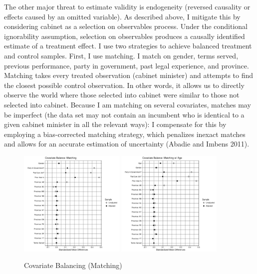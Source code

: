 \documentclass[letter,12pt]{article}
\begin{document}
The other major threat to estimate validity is endogeneity (reversed causality or effects caused by an omitted variable). As described above, I mitigate this by considering cabinet as a selection on observables process. Under the conditional ignorability assumption, selection on observables produces a causally identified estimate of a treatment effect. I use two strategies to achieve balanced treatment and control samples. First, I use matching. I match on gender, terms served, previous performance, party in government, past legal experience, and province. Matching takes every treated observation (cabinet minister) and attempts to find the closest possible control observation. In other words, it allows us to directly observe the world where those selected into cabinet were similar to those not selected into cabinet. Because I am matching on several covariates, matches may be imperfect (the data set may not contain an incumbent who is identical to a given cabinet minister in all the relevant ways): I compensate for this by employing a bias-corrected matching strategy, which penalizes inexact matches and allows for an accurate estimation of uncertainty (Abadie and Imbens 2011).

\begin{figure}
\centering
\caption{Covariate Balancing (Matching)}
\includegraphics[width=0.45\textwidth]{"Includes/love_plot_match"}
\includegraphics[width=0.45\textwidth]{"Includes/love_plot_match_age"}
\end{figure}
\end{document}
